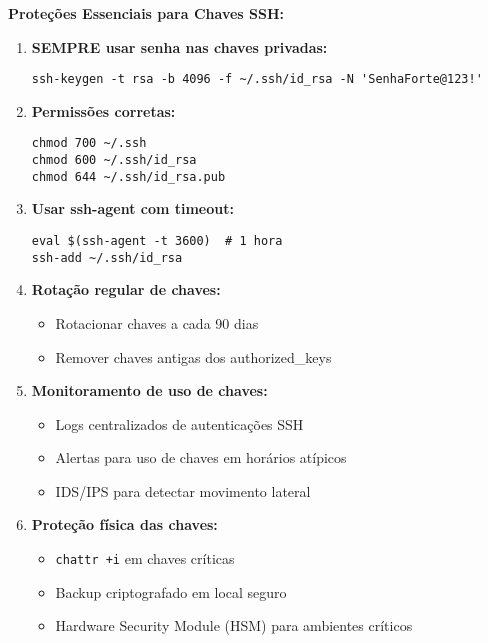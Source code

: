 \documentclass[12pt]{article}
\begin{document}
\textbf{Proteções Essenciais para Chaves SSH:}
\begin{enumerate}
    \item \textbf{SEMPRE usar senha nas chaves privadas:}
        \begin{verbatim}
ssh-keygen -t rsa -b 4096 -f ~/.ssh/id_rsa -N 'SenhaForte@123!'
        \end{verbatim}
    
    \item \textbf{Permissões corretas:}
        \begin{verbatim}
chmod 700 ~/.ssh
chmod 600 ~/.ssh/id_rsa
chmod 644 ~/.ssh/id_rsa.pub
        \end{verbatim}
    
    \item \textbf{Usar ssh-agent com timeout:}
        \begin{verbatim}
eval $(ssh-agent -t 3600)  # 1 hora
ssh-add ~/.ssh/id_rsa
        \end{verbatim}
    
    \item \textbf{Rotação regular de chaves:}
        \begin{itemize}
            \item Rotacionar chaves a cada 90 dias
            \item Remover chaves antigas dos authorized\_keys
        \end{itemize}
    
    \item \textbf{Monitoramento de uso de chaves:}
        \begin{itemize}
            \item Logs centralizados de autenticações SSH
            \item Alertas para uso de chaves em horários atípicos
            \item IDS/IPS para detectar movimento lateral
        \end{itemize}
    
    \item \textbf{Proteção física das chaves:}
        \begin{itemize}
            \item \texttt{chattr +i} em chaves críticas
            \item Backup criptografado em local seguro
            \item Hardware Security Module (HSM) para ambientes críticos
        \end{itemize}
\end{enumerate}
\end{document}
